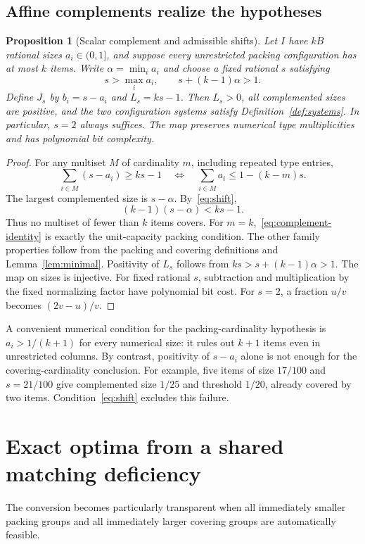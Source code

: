 \documentclass[11pt,a4paper]{article}
\newtheorem{proposition}[theorem]{Proposition}
\theoremstyle{definition}
\theoremstyle{remark}
\begin{document}
\subsection{Affine complements realize the hypotheses}
\begin{proposition}[Scalar complement and admissible shifts]\label{prop:complement}
Let $I$ have $kB$ rational sizes $a_i\in(0,1]$, and suppose every unrestricted packing configuration has at most $k$ items. Write $\alpha=\min_i a_i$ and choose a fixed rational $s$ satisfying
\begin{equation}\label{eq:shift}
 s>\max_i a_i,\qquad s+(k-1)\alpha>1.
\end{equation}
Define $J_s$ by $b_i=s-a_i$ and $L_s=ks-1$. Then $L_s>0$, all complemented sizes are positive, and the two configuration systems satisfy Definition~\ref{def:systems}. In particular, $s=2$ always suffices. The map preserves numerical type multiplicities and has polynomial bit complexity.
\end{proposition}
\begin{proof}
For any multiset $M$ of cardinality $m$, including repeated type entries,
\begin{equation}\label{eq:complement-identity}
 \sum_{i\in M}(s-a_i)\ge ks-1
 \quad\Longleftrightarrow\quad
 \sum_{i\in M}a_i\le1-(k-m)s.
\end{equation}
The largest complemented size is $s-\alpha$. By~\eqref{eq:shift},
\[
 (k-1)(s-\alpha)<ks-1.
\]
Thus no multiset of fewer than $k$ items covers. For $m=k$,~\eqref{eq:complement-identity} is exactly the unit-capacity packing condition. The other family properties follow from the packing and covering definitions and Lemma~\ref{lem:minimal}. Positivity of $L_s$ follows from $ks>s+(k-1)\alpha>1$. The map on sizes is injective. For fixed rational $s$, subtraction and multiplication by the fixed normalizing factor have polynomial bit cost. For $s=2$, a fraction $u/v$ becomes $(2v-u)/v$.
\end{proof}
A convenient numerical condition for the packing-cardinality hypothesis is $a_i>1/(k+1)$ for every numerical size: it rules out $k+1$ items even in unrestricted columns. By contrast, positivity of $s-a_i$ alone is not enough for the covering-cardinality conclusion. For example, five items of size $17/100$ and $s=21/100$ give complemented size $1/25$ and threshold $1/20$, already covered by two items. Condition~\eqref{eq:shift} excludes this failure.

\section{Exact optima from a shared matching deficiency}\label{sec:matching}
The conversion becomes particularly transparent when all immediately smaller packing groups and all immediately larger covering groups are automatically feasible.
\end{document}
